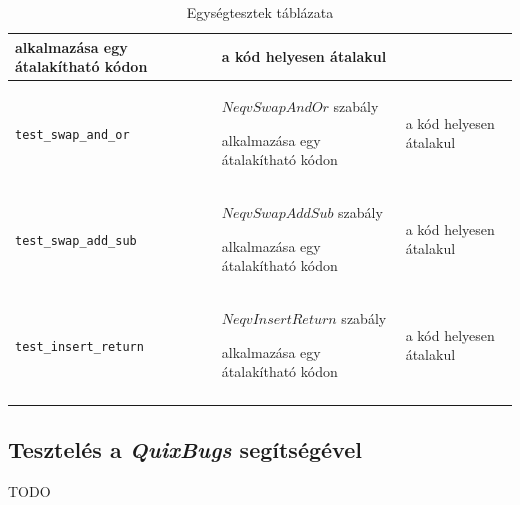 \begin{center}
\begin{longtable}{ | p{} | p{} | p{} | }
		alkalmazása egy átalakítható kódon
		&
		a kód helyesen átalakul
		\\
		\hline

		\texttt{\lstinline{test_swap_and_or}}
		&
		$NeqvSwapAndOr$ szabály
		
		alkalmazása egy átalakítható kódon
		&
		a kód helyesen átalakul
		\\
		\hline

		\texttt{\lstinline{test_swap_add_sub}}
		&
		$NeqvSwapAddSub$ szabály
		
		alkalmazása egy átalakítható kódon
		&
		a kód helyesen átalakul
		\\
		\hline

		\texttt{\lstinline{test_insert_return}}
		&
		$NeqvInsertReturn$ szabály
		
		alkalmazása egy átalakítható kódon
		&
		a kód helyesen átalakul
		\\
		\hline

		\caption{Egységtesztek táblázata}
		\label{tab:unit_tests}
	\end{longtable}
\end{center}

\pagebreak

\subsection{Tesztelés a \emph{QuixBugs} segítségével\label{sec:QuixBugs}}

TODO

\pagebreak
